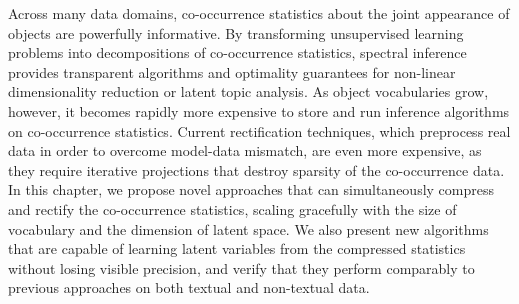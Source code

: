 Across many data domains, co\hyp{}occurrence statistics about the joint
appearance of objects are powerfully informative. By transforming unsupervised
learning problems into decompositions of co\hyp{}occurrence statistics, spectral
inference provides transparent algorithms and optimality guarantees for
non-linear dimensionality reduction or latent topic analysis. As object
vocabularies grow, however, it becomes rapidly more expensive to store and run
inference algorithms on co\hyp{}occurrence statistics. Current rectification
techniques, which preprocess real data in order to overcome model-data mismatch,
are even more expensive, as they require iterative projections that destroy
sparsity of the co\hyp{}occurrence data. In this chapter, we propose novel
approaches that can simultaneously compress and rectify the co\hyp{}occurrence
statistics, scaling gracefully with the size of vocabulary and the dimension of
latent space. We also present new algorithms that are capable of learning latent
variables from the compressed statistics without losing visible precision, and
verify that they perform comparably to previous approaches on both textual and
non-textual data.
